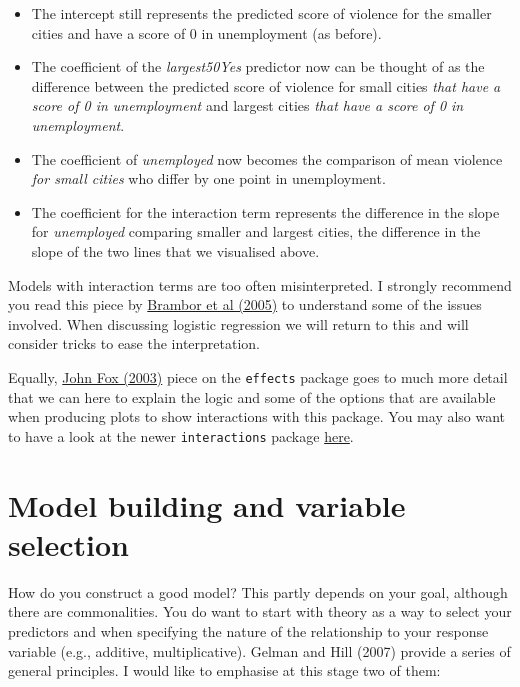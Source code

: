 \documentclass[
]{book}
\begin{document}
\begin{itemize}
\item
  The intercept still represents the predicted score of violence for the smaller cities and have a score of 0 in unemployment (as before).
\item
  The coefficient of the \emph{largest50Yes} predictor now can be thought of as the difference between the predicted score of violence for small cities \emph{that have a score of 0 in unemployment} and largest cities \emph{that have a score of 0 in unemployment}.
\item
  The coefficient of \emph{unemployed} now becomes the comparison of mean violence \emph{for small cities} who differ by one point in unemployment.
\item
  The coefficient for the interaction term represents the difference in the slope for \emph{unemployed} comparing smaller and largest cities, the difference in the slope of the two lines that we visualised above.
\end{itemize}

Models with interaction terms are too often misinterpreted. I strongly recommend you read this piece by \href{https://files.nyu.edu/mrg217/public/pa_final.pdf}{Brambor et al (2005)} to understand some of the issues involved. When discussing logistic regression we will return to this and will consider tricks to ease the interpretation.

Equally, \href{http://www.jstatsoft.org/v08/i15/paper}{John Fox (2003)} piece on the \texttt{effects} package goes to much more detail that we can here to explain the logic and some of the options that are available when producing plots to show interactions with this package. You may also want to have a look at the newer \texttt{interactions} package \href{https://interactions.jacob-long.com/index.html}{here}.

\hypertarget{model-building-and-variable-selection}{%
\section{Model building and variable selection}\label{model-building-and-variable-selection}}

How do you construct a good model? This partly depends on your goal, although there are commonalities. You do want to start with theory as a way to select your predictors and when specifying the nature of the relationship to your response variable (e.g., additive, multiplicative). Gelman and Hill (2007) provide a series of general principles. I would like to emphasise at this stage two of them:
\end{document}
